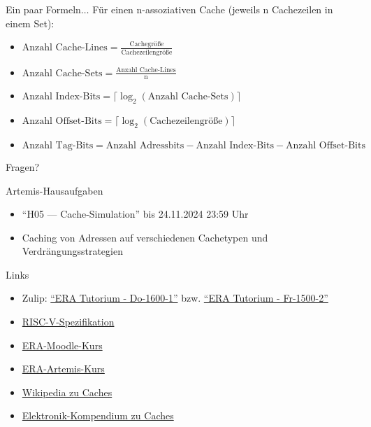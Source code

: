 \documentclass[
  german,            %
  aspectratio=169,    %
]{tumbeamer}
\begin{document}
\begin{frame}[c, fragile]{Ein paar Formeln$\ldots$}
  Für einen n-assoziativen Cache (jeweils n Cachezeilen in einem Set):
  \vspace{0.25cm}
  \begin{itemize}
    \item $\textrm{Anzahl Cache-Lines}=\frac{\textrm{Cachegröße}}{\textrm{Cachezeilengröße}}$
    \item $\textrm{Anzahl Cache-Sets}=\frac{\textrm{Anzahl Cache-Lines}}{\textrm{n}}$
    \item $\textrm{Anzahl Index-Bits}=\lceil\log_2(\textrm{Anzahl Cache-Sets})\rceil$
    \item $\textrm{Anzahl Offset-Bits}=\lceil\log_2(\textrm{Cachezeilengröße})\rceil$
    \item $\textrm{Anzahl Tag-Bits}= \textrm{Anzahl Adressbits} - \textrm{Anzahl Index-Bits} - \textrm{Anzahl Offset-Bits}$
  \end{itemize}
\end{frame}
\begin{frame}[c, fragile]{}{}
  \begin{center}
    \LARGE Fragen?
  \end{center}
\end{frame}

\begin{frame}[c, fragile]{Artemis-Hausaufgaben}{}
  \begin{itemize}
    \item \enquote{H05 --- Cache-Simulation} bis 24.11.2024 23:59 Uhr
    \item Caching von Adressen auf verschiedenen Cachetypen und Verdrängungsstrategien
  \end{itemize}
\end{frame}

\begin{frame}[c, fragile]{Links}{}
  \begin{itemize}
    \item Zulip: \href{https://zulip.in.tum.de/#narrow/stream/2661-ERA-Tutorium---Do-1600-1}{\enquote{ERA Tutorium - Do-1600-1}}
          bzw. \href{https://zulip.in.tum.de/#narrow/stream/2675-ERA-Tutorium---Fr-1500-2 }{\enquote{ERA Tutorium - Fr-1500-2}}
    \item \href{https://riscv.org/wp-content/uploads/2017/05/riscv-spec-v2.2.pdf}{RISC-V-Spezifikation}
    \item \href{https://www.moodle.tum.de/course/view.php?id=100633}{ERA-Moodle-Kurs}
    \item \href{https://artemis.in.tum.de/courses/401}{ERA-Artemis-Kurs}
    \item \href{https://en.wikipedia.org/wiki/Cache_placement_policies}{Wikipedia zu Caches}
    \item \href{https://www.elektronik-kompendium.de/sites/com/0309291.htm}{Elektronik-Kompendium zu Caches}
  \end{itemize}
\end{frame}

\maketitle
\end{document}
